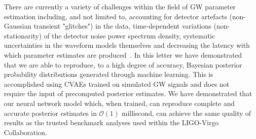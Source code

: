 \documentclass[%
showpacs,
 amsmath,amssymb,
 aps,
 twocolumn,
 prl,
 reprint,
floatfix,
]{revtex4-1}
\begin{document}
%
%
%
There are currently a variety of challenges within the field of \ac{GW}
parameter estimation including, and not limited to, accounting for detector
artefacts (non-Gaussian transient "glitches") in the data, time-dependent
variations (non-stationarity) of the detector noise power spectrum density,
systematic uncertainties in the waveform models themselves and decreasing the
latency with which parameter estimates are produced~\cite{1409.7215}. In this
letter we have demonstrated that we are able to reproduce, to a high degree of
accuracy, Bayesian posterior probability distributions generated through
machine learning. This is accomplished using \acp{CVAE} trained on simulated
\ac{GW} signals and does not require the input of precomputed posterior
estimates. We have demonstrated that our neural network model which, when
trained, can reproduce complete and accurate posterior estimates in
$\mathcal{O}(1)$ milliscond, can achieve the same quality of results as the
trusted benchmark analyses used within the LIGO-Virgo Collaboration.
\end{document}
